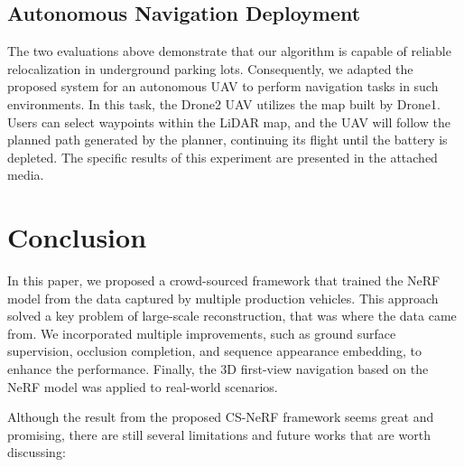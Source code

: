 \documentclass[conference]{./support/ieeeconf}
\begin{document}
\subsection{Autonomous Navigation Deployment}
The two evaluations above demonstrate that our algorithm is capable of reliable relocalization in underground parking lots. Consequently, we adapted the proposed system for an autonomous UAV to perform navigation tasks in such environments. In this task, the Drone2 UAV utilizes the map built by Drone1. Users can select waypoints within the LiDAR map, and the UAV will follow the planned path generated by the planner, continuing its flight until the battery is depleted. The specific results of this experiment are presented in the attached media.

\section{Conclusion}
In this paper, we proposed a crowd-sourced framework that trained the NeRF model from the data captured by multiple production vehicles.
This approach solved a key problem of large-scale reconstruction, that was where the data came from.
We incorporated multiple improvements, such as ground surface supervision, occlusion completion, and sequence appearance embedding, to enhance the performance.
Finally, the 3D first-view navigation based on the NeRF model was applied to real-world scenarios.

Although the result from the proposed CS-NeRF framework seems great and promising, there are still several limitations and future works that are worth discussing:

\clearpage


\end{document}
